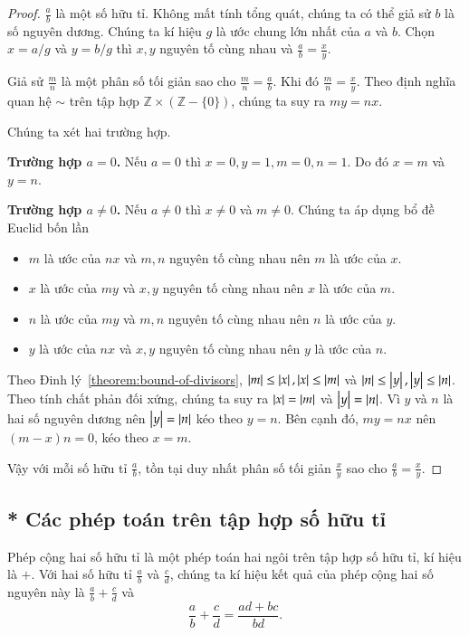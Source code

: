 \begin{proof}
    $\frac{a}{b}$ là một số hữu tỉ. Không mất tính tổng quát, chúng ta có thể giả sử $b$ là số nguyên dương. Chúng ta kí hiệu $g$ là ước chung lớn nhất của $a$ và $b$. Chọn $x = a/g$ và $y = b/g$ thì $x, y$ nguyên tố cùng nhau và $\frac{a}{b} = \frac{x}{y}$.

    Giả sử $\frac{m}{n}$ là một phân số tối giản sao cho $\frac{m}{n} = \frac{a}{b}$. Khi đó $\frac{m}{n} = \frac{x}{y}$. Theo định nghĩa quan hệ $\sim$ trên tập hợp $\mathbb{Z}\times (\mathbb{Z} - \{0\})$, chúng ta suy ra $m y = n x$.

    Chúng ta xét hai trường hợp.

    \textbf{Trường hợp $a = 0$.} Nếu $a = 0$ thì $x = 0, y = 1, m = 0, n = 1$. Do đó $x = m$ và $y = n$.

    \textbf{Trường hợp $a\ne 0$.} Nếu $a\ne 0$ thì $x\ne 0$ và $m\ne 0$. Chúng ta áp dụng bổ đề Euclid bốn lần
    \begin{itemize}
        \item $m$ là ước của $n x$ và $m, n$ nguyên tố cùng nhau nên $m$ là ước của $x$.
        \item $x$ là ước của $m y$ và $x, y$ nguyên tố cùng nhau nên $x$ là ước của $m$.
        \item $n$ là ước của $m y$ và $m, n$ nguyên tố cùng nhau nên $n$ là ước của $y$.
        \item $y$ là ước của $n x$ và $x, y$ nguyên tố cùng nhau nên $y$ là ước của $n$.
    \end{itemize}

    Theo Đinh lý~\ref{theorem:bound-of-divisors}, $\left\vert{m}\right\vert \leq \left\vert{x}\right\vert, \left\vert{x}\right\vert \leq \left\vert{m}\right\vert$ và $\left\vert{n}\right\vert \leq \left\vert{y}\right\vert, \left\vert{y}\right\vert \leq \left\vert{n}\right\vert$. Theo tính chất phản đối xứng, chúng ta suy ra $\left\vert{x}\right\vert = \left\vert{m}\right\vert$ và $\left\vert{y}\right\vert = \left\vert{n}\right\vert$. Vì $y$ và $n$ là hai số nguyên dương nên $\left\vert{y}\right\vert = \left\vert{n}\right\vert$ kéo theo $y = n$. Bên cạnh đó, $m y = n x$ nên $(m - x) n = 0$, kéo theo $x = m$.

    Vậy với mỗi số hữu tỉ $\frac{a}{b}$, tồn tại duy nhất phân số tối giản $\frac{x}{y}$ sao cho $\frac{a}{b} = \frac{x}{y}$.
\end{proof}

\subsection{* Các phép toán trên tập hợp số hữu tỉ}

\begin{definition}
    Phép cộng hai số hữu tỉ là một phép toán hai ngôi trên tập hợp số hữu tỉ, kí hiệu là $+$. Với hai số hữu tỉ $\frac{a}{b}$ và $\frac{c}{d}$, chúng ta kí hiệu kết quả của phép cộng hai số nguyên này là $\frac{a}{b} + \frac{c}{d}$ và
    \[
        \frac{a}{b} + \frac{c}{d} = \frac{a d + b c}{b d}.
    \]
\end{definition}

